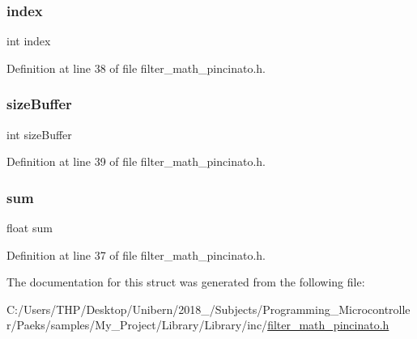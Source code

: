 \mbox{\label{struct_average_filter___a750b5d744c39a06bfb13e6eb010e35d0}} 
\subsubsection{\texorpdfstring{index}{index}}
{\footnotesize\ttfamily int index}



Definition at line 38 of file filter\+\_\+math\+\_\+pincinato.\+h.

\mbox{\label{struct_average_filter___a145948232f729807d798ee4339711815}} 
\subsubsection{\texorpdfstring{size\+Buffer}{sizeBuffer}}
{\footnotesize\ttfamily int size\+Buffer}



Definition at line 39 of file filter\+\_\+math\+\_\+pincinato.\+h.

\mbox{\label{struct_average_filter___aeeafe7e9eebbd2a45ce4fa2ae0d96c51}} 
\subsubsection{\texorpdfstring{sum}{sum}}
{\footnotesize\ttfamily float sum}



Definition at line 37 of file filter\+\_\+math\+\_\+pincinato.\+h.



The documentation for this struct was generated from the following file\+:\begin{DoxyCompactItemize}
\item 
C\+:/\+Users/\+T\+H\+P/\+Desktop/\+Unibern/2018\+\_/\+Subjects/\+Programming\+\_\+\+Microcontroller/\+Paeks/samples/\+My\+\_\+\+Project/\+Library/\+Library/inc/\mbox{\hyperlink{filter__math__pincinato_8h}{filter\+\_\+math\+\_\+pincinato.\+h}}\end{DoxyCompactItemize}
